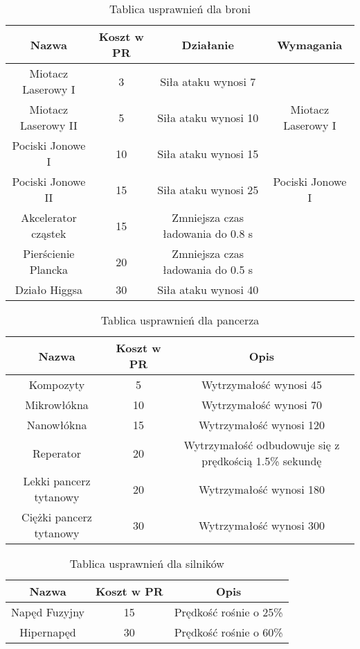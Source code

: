 \begin{table}[h]
\centering
\begin{tabular}{ | c | c | c | c | }
\hline
\textbf{Nazwa} & \textbf{Koszt w PR} & \textbf{Działanie} & \textbf{Wymagania}  \\
\hline
Miotacz Laserowy I & 3 & Siła ataku wynosi 7 & \\ \hline
Miotacz Laserowy II & 5 & Siła ataku wynosi 10 & Miotacz Laserowy I \\ \hline
Pociski Jonowe I & 10 & Siła ataku wynosi 15 & \\ \hline
Pociski Jonowe II & 15 & Siła ataku wynosi 25 & Pociski Jonowe I \\ \hline
Akcelerator cząstek & 15 & Zmniejsza czas ładowania do 0.8 s & \\ \hline
Pierścienie Plancka & 20 & Zmniejsza czas ładowania do 0.5 s & \\ \hline
Działo Higgsa & 30 & Siła ataku wynosi 40 & \\ \hline
\end{tabular}
\caption{Tablica usprawnień dla broni}
\end{table}

\begin{table}[h]
\centering
\begin{tabular}{ | c | c | c | }
\hline
\textbf{Nazwa} & \textbf{Koszt w PR} & \textbf{Opis} \\
\hline
Kompozyty & 5 & Wytrzymałość wynosi 45 \\ \hline
Mikrowłókna & 10 & Wytrzymałość wynosi 70 \\ \hline
Nanowłókna & 15 & Wytrzymałość wynosi 120 \\ \hline
Reperator & 20 & Wytrzymałość odbudowuje się z prędkością 1.5\% sekundę \\ \hline
Lekki pancerz tytanowy & 20 & Wytrzymałość wynosi 180 \\ \hline
Ciężki pancerz tytanowy & 30 & Wytrzymałość wynosi 300 \\ \hline
\end{tabular}
\caption{Tablica usprawnień dla pancerza}
\end{table}

\begin{table}[h]
\centering
\begin{tabular}{ | c | c | c | }
\hline
\textbf{Nazwa} & \textbf{Koszt w PR} & \textbf{Opis} \\
\hline
Napęd Fuzyjny & 15 & Prędkość rośnie o 25\% \\ \hline
Hipernapęd & 30 & Prędkość rośnie o 60\% \\ \hline
\end{tabular}
\caption{Tablica usprawnień dla silników}
\end{table}
